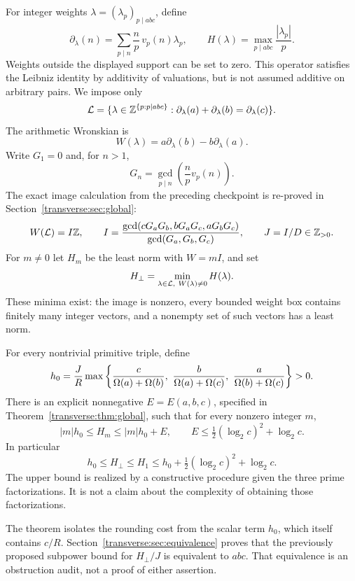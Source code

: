 For integer weights $\lambda=(\lambda_p)_{p\mid abc}$, define
\begin{equation}\label{transverse:eq:derivative}
 \partial_\lambda(n)=\sum_{p\mid n}\frac np\,v_p(n)\lambda_p,
 \qquad
 H(\lambda)=\max_{p\mid abc}\frac{|\lambda_p|}{p}.
\end{equation}
Weights outside the displayed support can be set to zero. This operator satisfies the Leibniz identity by additivity of valuations, but is not assumed additive on arbitrary pairs. We impose only
\[
 \mathcal L=\{\lambda\in\mathbb Z^{\{p:p\mid abc\}}:
 \partial_\lambda(a)+\partial_\lambda(b)=\partial_\lambda(c)\}.
\]
The arithmetic Wronskian is
\[
 W(\lambda)=a\partial_\lambda(b)-b\partial_\lambda(a).
\]
Write $G_1=0$ and, for $n>1$,
\[
 G_n=\gcd_{p\mid n}\left(\frac np v_p(n)\right).
\]
The exact image calculation from the preceding checkpoint \cite{transverse:normalforms} is re-proved in Section~\ref{transverse:sec:global}:
\begin{equation}\label{transverse:eq:I}
 W(\mathcal L)=I\mathbb Z,\qquad
 I=\frac{\gcd(cG_aG_b,bG_aG_c,aG_bG_c)}{\gcd(G_a,G_b,G_c)},
 \qquad J=I/D\in\mathbb Z_{>0}.
\end{equation}
For $m\ne0$ let $H_m$ be the least norm with $W=mI$, and set
\[
 H_\perp=\min_{\lambda\in\LL,\ W(\lambda)\ne0}H(\lambda).
\]
These minima exist: the image is nonzero, every bounded weight box contains finitely many integer vectors, and a nonempty set of such vectors has a least norm.

\begin{theorem}\label{transverse:thm:main}
For every nontrivial primitive triple, define
\begin{equation}\label{transverse:eq:h0}
 h_0=\frac JR\max\left\{
 \frac{c}{\Omega(a)+\Omega(b)},\
 \frac{b}{\Omega(a)+\Omega(c)},\
 \frac{a}{\Omega(b)+\Omega(c)}\right\}>0.
\end{equation}
There is an explicit nonnegative $E=E(a,b,c)$, specified in Theorem~\ref{transverse:thm:global}, such that for every nonzero integer $m$,
\begin{equation}\label{transverse:eq:levelbound}
 |m|h_0\le H_m\le |m|h_0+E,
 \qquad
 E\le\tfrac12(\log_2c)^2+\log_2c.
\end{equation}
In particular
\begin{equation}\label{transverse:eq:Hperp}
 h_0\le H_\perp\le H_1\le h_0+\tfrac12(\log_2c)^2+\log_2c.
\end{equation}
The upper bound is realized by a constructive procedure given the three prime factorizations. It is not a claim about the complexity of obtaining those factorizations.
\end{theorem}
The theorem isolates the rounding cost from the scalar term $h_0$, which itself contains $c/R$. Section~\ref{transverse:sec:equivalence} proves that the previously proposed subpower bound for $H_\perp/J$ is equivalent to $abc$. That equivalence is an obstruction audit, not a proof of either assertion.

